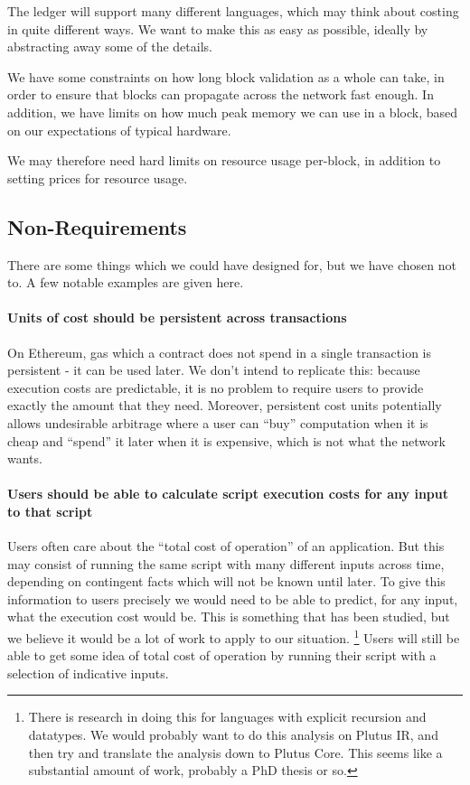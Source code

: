 \begin{requirement}
\label{req:costing-language-agnostic}
The ledger will support many different languages, which may think about costing in quite different ways.
We want to make this as easy as possible, ideally by abstracting away some of the details.
\end{requirement}

\begin{requirement}
\label{req:costing-block-budget}
We have some constraints on how long block validation as a whole can take, in order to ensure that blocks can propagate across the network fast enough.
In addition, we have limits on how much peak memory we can use in a block, based on our expectations of typical hardware.

We may therefore need hard limits on resource usage per-block, in addition to setting prices for resource usage.
\end{requirement}

\subsection{Non-Requirements}
There are some things which we could have designed for, but we have chosen not to.
A few notable examples are given here.

\paragraph{Units of cost should be persistent across transactions}
On Ethereum, gas which a contract does not spend in a single transaction is persistent - it can be used later.
We don't intend to replicate this: because execution costs are predictable, it is no problem to require users to provide exactly the amount that they need.
Moreover, persistent cost units potentially allows undesirable arbitrage where a user can ``buy'' computation when it is cheap and ``spend'' it later when it is expensive, which is not what the network wants.

\paragraph{Users should be able to calculate script execution costs for any input to that script}
Users often care about the ``total cost of operation'' of an application.
But this may consist of running the same script with many different inputs across time, depending on contingent facts which will not be known until later.
To give this information to users precisely we would need to be able to predict, for any input, what the execution cost would be.
This is something that has been studied, but we believe it would be a lot of work to apply to our situation.
\footnote{
  There is research in doing this for languages with explicit recursion and datatypes.
  We would probably want to do this analysis on Plutus IR, and then try and translate the analysis down to Plutus Core.
  This seems like a substantial amount of work, probably a PhD thesis or so.
}
Users will still be able to get some idea of total cost of operation by running their script with a selection of indicative inputs.

